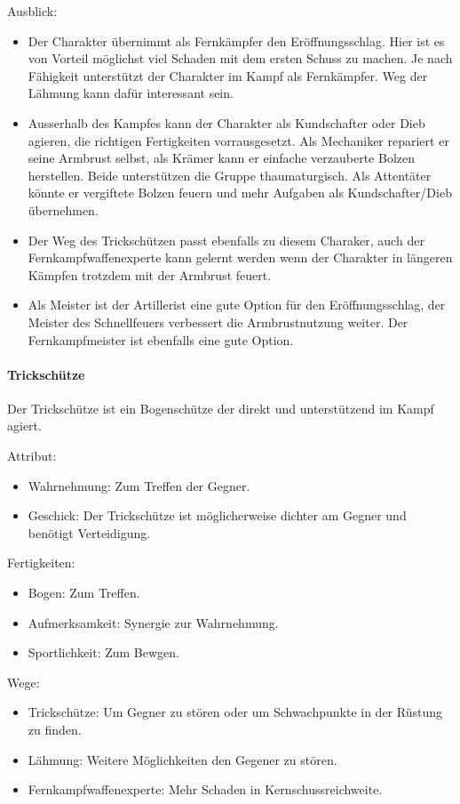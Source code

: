 \documentclass{article}
\begin{document}
Ausblick:
\begin{itemize}
\item Der Charakter übernimmt als Fernkämpfer den Eröffnungsschlag. Hier ist es von Vorteil möglichst viel Schaden mit dem ersten Schuss zu machen. Je nach Fähigkeit unterstützt der Charakter im Kampf als Fernkämpfer. Weg der Lähmung kann dafür interessant sein.
\item Ausserhalb des Kampfes kann der Charakter als Kundschafter oder Dieb agieren, die richtigen Fertigkeiten vorrausgesetzt. Als Mechaniker repariert er seine Armbrust selbst, als Krämer kann er einfache verzauberte Bolzen herstellen. Beide unterstützen die Gruppe thaumaturgisch. Als Attentäter könnte er vergiftete Bolzen feuern und mehr Aufgaben als Kundschafter/Dieb übernehmen.
\item Der Weg des Trickschützen passt ebenfalls zu diesem Charaker, auch der Fernkampfwaffenexperte kann gelernt werden wenn der Charakter in längeren Kämpfen trotzdem mit der Armbrust feuert.
\item Als Meister ist der Artillerist eine gute Option für den Eröffnungsschlag, der Meister des Schnellfeuers verbessert die Armbrustnutzung weiter. Der Fernkampfmeister ist ebenfalls eine gute Option.
\end{itemize}

\paragraph{Trickschütze}
Der Trickschütze ist ein Bogenschütze der direkt und unterstützend im Kampf agiert.

Attribut:
\begin{itemize}
\item Wahrnehmung: Zum Treffen der Gegner.
\item Geschick: Der Trickschütze ist möglicherweise dichter am Gegner und benötigt Verteidigung.
\end{itemize}

Fertigkeiten:
\begin{itemize}
\item Bogen: Zum Treffen.
\item Aufmerksamkeit: Synergie zur Wahrnehmung.
\item Sportlichkeit: Zum Bewgen.
\end{itemize}

Wege:
\begin{itemize}
\item Trickschütze: Um Gegner zu stören oder um Schwachpunkte in der Rüstung zu finden.
\item Lähmung: Weitere Möglichkeiten den Gegener zu stören.
\item Fernkampfwaffenexperte: Mehr Schaden in Kernschussreichweite.
\end{itemize}
\end{document}
